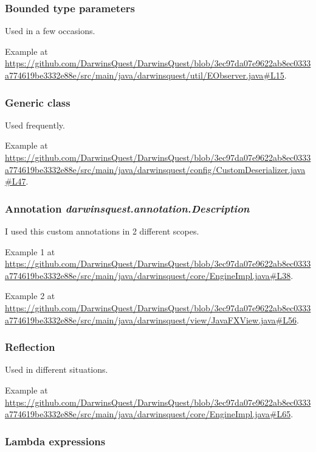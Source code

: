 \documentclass[12pt, a4paper]{report}
\begin{document}
        \subsubsection{Bounded type parameters}

        Used in a few occasions.

        Example at \url{https://github.com/DarwinsQuest/DarwinsQuest/blob/3ec97da07e9622ab8ec0333a774619be3332e88e/src/main/java/darwinsquest/util/EObserver.java#L15}.

        \subsubsection{Generic class}
        
        Used frequently.

        Example at \url{https://github.com/DarwinsQuest/DarwinsQuest/blob/3ec97da07e9622ab8ec0333a774619be3332e88e/src/main/java/darwinsquest/config/CustomDeserializer.java#L47}.

        \subsubsection{Annotation \emph{darwinsquest.annotation.Description}}

        I used this custom annotations in 2 different scopes.

        Example 1 at \url{https://github.com/DarwinsQuest/DarwinsQuest/blob/3ec97da07e9622ab8ec0333a774619be3332e88e/src/main/java/darwinsquest/core/EngineImpl.java#L38}.

        Example 2 at \url{https://github.com/DarwinsQuest/DarwinsQuest/blob/3ec97da07e9622ab8ec0333a774619be3332e88e/src/main/java/darwinsquest/view/JavaFXView.java#L56}.

        \subsubsection{Reflection}

        Used in different situations.

        Example at \url{https://github.com/DarwinsQuest/DarwinsQuest/blob/3ec97da07e9622ab8ec0333a774619be3332e88e/src/main/java/darwinsquest/core/EngineImpl.java#L65}.

        \subsubsection{Lambda expressions}
\end{document}
